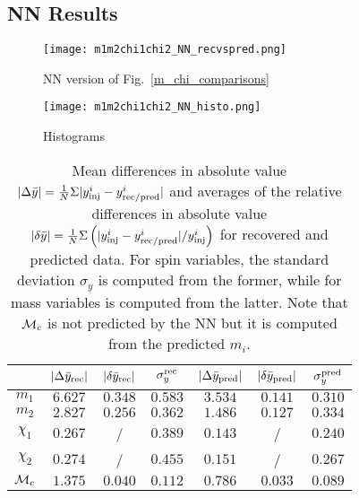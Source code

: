 \subsection{NN Results}

\begin{figure}
    \texttt{[image: m1m2chi1chi2\_NN\_recvspred.png]}
    \caption{NN version of Fig.~\ref{m_chi_comparisons}}
        \label{m1m2chi1chi2_NN_recvspred}
\end{figure}

\begin{figure}
    \centering
    \texttt{[image: m1m2chi1chi2\_NN\_histo.png]}
    \caption{Histograms}
        \label{m1m2chi1chi2_NN_histo}
\end{figure}

\begin{table} 
  \caption{\label{tab:NN_errors}  Mean differences in absolute value $|\Delta \bar{y}|=  \frac{1}{N} \Sigma |y^i_{\rm inj} - y^i_{\rm rec/pred}|$  
  and averages of the relative 
  differences in absolute value $|\delta \bar{y}| = \frac{1}{N} \Sigma \left( |y^i_{\rm inj} - y^i_{\rm rec/pred}|/y^i_{\rm inj} \right) $ for recovered and predicted data. 
  For spin variables, the standard deviation $\sigma_y$ is computed from the former, while for mass variables is computed from the latter. 
  Note that ${\cal{M}}_c$ is not predicted by the NN but it is computed from the predicted $m_i$.}
  \begin{center}
  \begin{tabular}{c|ccc|ccc}
  \hline\hline
  & $|\Delta \bar{y}_{\rm rec}|$  & $|\delta \bar{y}_{\rm rec}|$  & $\sigma_y^{\rm rec}$ & 
     $|\Delta \bar{y}_{\rm pred}|$ & $|\delta \bar{y}_{\rm pred}|$ & $\sigma_y^{\rm pred}$ \\
  \hline\hline
$m_1$          & $6.627$ & $0.348$ & $0.583$ & $3.534$ & $0.141$ & $0.310$ \\
$m_2$          & $2.827$ & $0.256$ & $0.362$ & $1.486$ & $0.127$ & $0.334$ \\
$\chi_1$       & $0.267$ &  /  & $0.389$ & $0.143$ &  /  & $0.240$ \\
$\chi_2$       & $0.274$ &  /  & $0.455$ & $0.151$ &  /  & $0.267$ \\
\hline
${\cal{M}}_c$  & $1.375$ & $0.040$ & $0.112$ & $0.786$ & $0.033$ & $0.089$ \\
  \hline\hline
\end{tabular}
\end{center}
\end{table}

